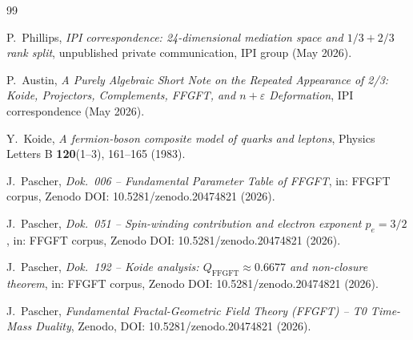 \begin{thebibliography}{99}

P.~Phillips,
\textit{IPI correspondence: 24-dimensional mediation space and
\(1/3 + 2/3\) rank split},
unpublished private communication, IPI group (May 2026).

P.~Austin,
\textit{A Purely Algebraic Short Note on the Repeated Appearance of 2/3:
Koide, Projectors, Complements, FFGFT, and \(n+\varepsilon\) Deformation},
IPI correspondence (May 2026).

Y.~Koide,
\textit{A fermion-boson composite model of quarks and leptons},
Physics Letters B \textbf{120}(1--3), 161--165 (1983).

J.~Pascher,
\textit{Dok.~006 -- Fundamental Parameter Table of FFGFT},
in: FFGFT corpus, Zenodo DOI: 10.5281/zenodo.20474821 (2026).

J.~Pascher,
\textit{Dok.~051 -- Spin-winding contribution and electron exponent
\(p_e = 3/2\)},
in: FFGFT corpus, Zenodo DOI: 10.5281/zenodo.20474821 (2026).

J.~Pascher,
\textit{Dok.~192 -- Koide analysis: \(Q_{\text{FFGFT}} \approx 0.6677\)
and non-closure theorem},
in: FFGFT corpus, Zenodo DOI: 10.5281/zenodo.20474821 (2026).

J.~Pascher,
\textit{Fundamental Fractal-Geometric Field Theory (FFGFT) --
T0 Time-Mass Duality},
Zenodo, DOI: 10.5281/zenodo.20474821 (2026).

\end{thebibliography}
